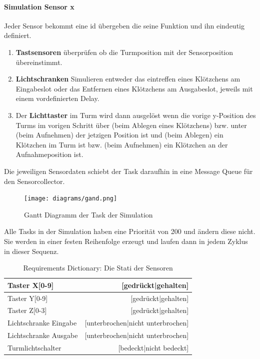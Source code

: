 \paragraph{Simulation Sensor x}
Jeder Sensor bekommt eine id übergeben die seine Funktion und ihn eindeutig definiert. 
\begin{enumerate} 
\item \textbf{Tastsensoren} überprüfen ob die Turmposition mit der Sensorposition übereinstimmt.
\item \textbf{Lichtschranken} Simulieren entweder das eintreffen eines Klötzchens am Eingabeslot oder das Entfernen eines Klötzchens am Ausgabeslot, jeweils mit einem vordefinierten Delay.
\item Der \textbf{Lichttaster} im Turm wird dann ausgelöst wenn die vorige y-Position des Turms im vorigen Schritt über (beim Ablegen eines Klötzchens) bzw. unter (beim Aufnehmen) der jetzigen Position ist und (beim Ablegen) ein Klötzchen im Turm ist bzw. (beim Aufnehmen) ein Klötzchen an der Aufnahmeposition ist.
\end{enumerate}
Die jeweiligen Sensordaten schiebt der Task daraufhin in eine Message Queue für den Sensorcollector.

\begin{figure}[H]
	\centering
  \texttt{[image: diagrams/gand.png]}
	\caption{Gantt Diagramm der Task der Simulation}
	\label{gantt}
\end{figure}

Alle Tasks in der Simulation haben eine Priorität von 200 und ändern diese nicht. Sie werden in einer festen Reihenfolge erzeugt und laufen dann in jedem Zyklus in dieser Sequenz.

\begin{table}[h]
\centering
\begin{tabular}{|l|r|}
\hline
Taster X[0-9] &  [gedrückt|gehalten] \\
\hline
Taster Y[0-9] &  [gedrückt|gehalten] \\
\hline
Taster Z[0-3] &  [gedrückt|gehalten] \\
\hline
Lichtschranke Eingabe & [unterbrochen|nicht unterbrochen] \\
\hline
Lichtschranke Ausgabe & [unterbrochen|nicht unterbrochen] \\
\hline
Turmlichtschalter & [bedeckt|nicht bedeckt]\\
\hline
\end{tabular}
\caption{Requirements Dictionary: Die Stati der Sensoren}
\label{tab:Requirements Dictionary}
\end{table}
